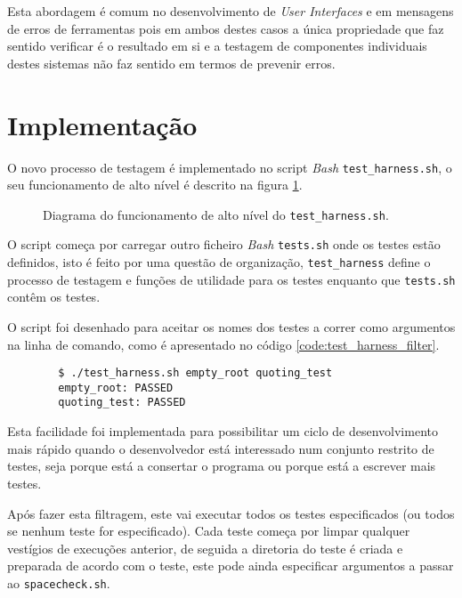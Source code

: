 Esta abordagem é comum no desenvolvimento de \emph{User Interfaces} e em
mensagens de erros de ferramentas pois em ambos destes casos a única propriedade
que faz sentido verificar é o resultado em si e a testagem de componentes
individuais destes sistemas não faz sentido em termos de prevenir erros.

\section{Implementação}

O novo processo de testagem é implementado no script \emph{Bash}
\Verb|test_harness.sh|, o seu funcionamento de alto nível é descrito na
figura \ref{fig:testing_diagram}.

\begin{figure}[H]
	\centering
	\begin{tikzpicture}[node distance=2cm]
		
	\end{tikzpicture}
	\cprotect\caption{Diagrama do funcionamento de alto nível do \Verb|test_harness.sh|.}
	\label{fig:testing_diagram}
\end{figure}

O script começa por carregar outro ficheiro \emph{Bash} \Verb|tests.sh| onde os testes
estão definidos, isto é feito por uma questão de organização,
\Verb|test_harness| define o processo de testagem e funções de utilidade para os
testes enquanto que \Verb|tests.sh| contêm os testes.

O script foi desenhado para aceitar os nomes dos testes a correr como argumentos
na linha de comando, como é apresentado no código \ref{code:test_harness_filter}.

\begin{listing}[H]
	\begin{verbatim}
		$ ./test_harness.sh empty_root quoting_test
		empty_root: PASSED
		quoting_test: PASSED
	\end{verbatim}
	\cprotect\caption{Exemplo de uso do \Verb|test_harness.sh| com filtragem.}
	\label{code:test_harness_filter}
\end{listing}

Esta facilidade foi implementada para possibilitar um ciclo de desenvolvimento
mais rápido quando o desenvolvedor está interessado num conjunto restrito de
testes, seja porque está a consertar o programa ou porque está a escrever mais
testes.

Após fazer esta filtragem, este vai executar todos os testes especificados
(ou todos se nenhum teste for especificado). Cada teste começa por limpar
qualquer vestígios de execuções anterior, de seguida a diretoria do teste
é criada e preparada de acordo com o teste, este pode ainda especificar
argumentos a passar ao \Verb|spacecheck.sh|.

